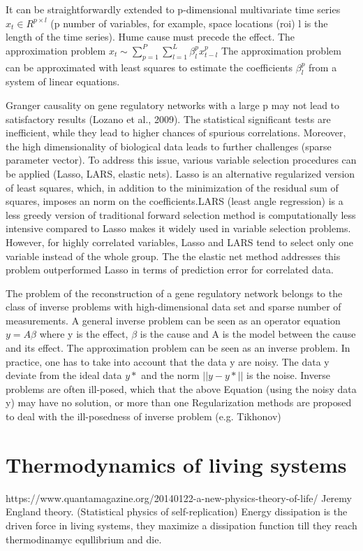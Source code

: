 \documentclass[onecollarge,runningheads]{svjour2}
\begin{document}
It can be straightforwardly extended to p-dimensional multivariate time series $x_t \in R^{p \times l }$ (p number of variables, for example, space locations (roi) l is the length of the time series).
Hume cause must precede the effect.
The approximation problem
$x_t \sim \sum_{p=1}^{P} \sum_{l=1}^{L}\beta_{l}^{p} x_{t-l}^{p}$
The approximation problem can be approximated with least squares to estimate the coefficients $\beta_{l}^{p}$ from a system of linear equations.


Granger causality on gene regulatory networks with a large p may not lead to satisfactory results (Lozano et al., 2009). The statistical significant tests are inefficient, while they lead to higher chances of spurious correlations. Moreover, the high dimensionality of biological data leads to further challenges (sparse parameter vector). To address this issue, various variable selection procedures can be applied (Lasso, LARS, elastic nets).
Lasso is an alternative regularized version of least squares, which, in addition to the minimization of the residual sum of squares, imposes an norm on the coefficients.LARS (least angle regression) is a less greedy version of traditional forward selection method is computationally less intensive compared to Lasso makes it widely used in variable selection problems. However, for highly correlated variables, Lasso and LARS tend to select only one variable instead of the whole group. The the elastic net method addresses this problem outperformed Lasso in terms of prediction error for correlated data.

The problem of the reconstruction of a gene regulatory network belongs to the class of inverse problems with high-dimensional data set and sparse number of measurements. A general inverse problem can be seen as an operator equation $y = A \beta$ where y is the effect, $\beta$ is the cause and A is the model between the cause and its effect. The approximation problem can be seen as an inverse problem.
In practice, one has to take into account that the data y  are noisy. The data y deviate from the ideal data $y*$ and the norm $||y - y* ||$ is the noise. 
Inverse problems are often ill-posed, which that the above Equation (using the noisy data y) may have no solution, or more than one Regularization methods are proposed to deal with the ill-posedness of inverse problem (e.g. Tikhonov)

\section{Thermodynamics of living systems}
https://www.quantamagazine.org/20140122-a-new-physics-theory-of-life/
Jeremy England theory. (Statistical physics of self-replication) Energy dissipation is the driven force in living systems, they maximize a dissipation function till they reach thermodinamyc equllibrium and die.
\end{document}

